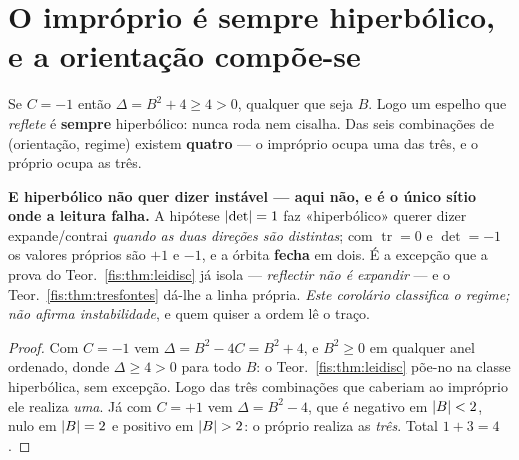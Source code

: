 \documentclass[livro.tex]{subfiles}
\begin{document}

\section{O impróprio é sempre hiperbólico, e a orientação compõe-se}\label{fis:improprio}

\begin{corolario}\label{fis:cor:optica}
Se $C=-1$ então $\Delta=B^{2}+4\ge4>0$, qualquer que seja $B$. Logo um espelho que
\emph{reflete} é \textbf{sempre} hiperbólico: nunca roda nem cisalha. Das seis
combinações de (orientação, regime) existem \textbf{quatro} --- o impróprio ocupa
uma das três, e o próprio ocupa as três.

\medskip\noindent\textbf{E hiperbólico não quer dizer instável --- aqui não, e é
o único sítio onde a leitura falha.} A hipótese $\lvert \det\rvert=1$ faz «hiperbólico»
querer dizer expande/contrai \emph{quando as duas direções são distintas}; com
$\operatorname{tr}=0$ e $\det=-1$ os valores próprios são $+1$ e $-1$, e a órbita
\textbf{fecha} em dois. É a excepção que a prova do Teor.~\ref{fis:thm:leidisc}
já isola --- \emph{reflectir não é expandir} --- e o Teor.~\ref{fis:thm:tresfontes}
dá-lhe a linha própria. \emph{Este corolário classifica o regime; não afirma
instabilidade}, e quem quiser a ordem lê o traço.
\end{corolario}

\begin{proof}
Com $C=-1$ vem $\Delta=B^{2}-4C=B^{2}+4$, e $B^{2}\ge0$ em qualquer anel
ordenado, donde $\Delta\ge4>0$ para todo $B$: o Teor.~\ref{fis:thm:leidisc}
põe-no na classe hiperbólica, sem excepção. Logo das três combinações que
caberiam ao impróprio ele realiza \emph{uma}. Já com $C=+1$ vem
$\Delta=B^{2}-4$, que é negativo em $\lvert B\rvert<2$, nulo em $\lvert B\rvert=2$ e positivo em
$\lvert B\rvert>2$: o próprio realiza as \emph{três}. Total $1+3=4$.
\end{proof}
\end{document}
